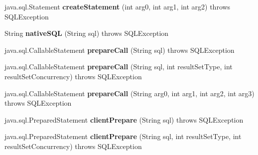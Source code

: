 \begin{DoxyCompactItemize}
java.\+sql.\+Statement {\bfseries create\+Statement} (int arg0, int arg1, int arg2)  throws S\+Q\+L\+Exception 
\item 
\mbox{\label{classcom_1_1mysql_1_1cj_1_1jdbc_1_1_connection_wrapper_aa607c2499080c544ea93a43c2e1e635a}} 
String {\bfseries native\+S\+QL} (String sql)  throws S\+Q\+L\+Exception 
\item 
\mbox{\label{classcom_1_1mysql_1_1cj_1_1jdbc_1_1_connection_wrapper_ab2c7f6bc0a7b9b072867f639c85c5ea7}} 
java.\+sql.\+Callable\+Statement {\bfseries prepare\+Call} (String sql)  throws S\+Q\+L\+Exception 
\item 
\mbox{\label{classcom_1_1mysql_1_1cj_1_1jdbc_1_1_connection_wrapper_ab4275f28104d43202583c58f600d320e}} 
java.\+sql.\+Callable\+Statement {\bfseries prepare\+Call} (String sql, int result\+Set\+Type, int result\+Set\+Concurrency)  throws S\+Q\+L\+Exception 
\item 
\mbox{\label{classcom_1_1mysql_1_1cj_1_1jdbc_1_1_connection_wrapper_af1c5e71dfedb6faeeff1964a37ea833a}} 
java.\+sql.\+Callable\+Statement {\bfseries prepare\+Call} (String arg0, int arg1, int arg2, int arg3)  throws S\+Q\+L\+Exception 
\item 
\mbox{\label{classcom_1_1mysql_1_1cj_1_1jdbc_1_1_connection_wrapper_a9d4c3ed2f9808b0941df0be53b2be648}} 
java.\+sql.\+Prepared\+Statement {\bfseries client\+Prepare} (String sql)  throws S\+Q\+L\+Exception 
\item 
\mbox{\label{classcom_1_1mysql_1_1cj_1_1jdbc_1_1_connection_wrapper_a97c0bd9d37c2cf6bfd6c0cf9e30fb101}} 
java.\+sql.\+Prepared\+Statement {\bfseries client\+Prepare} (String sql, int result\+Set\+Type, int result\+Set\+Concurrency)  throws S\+Q\+L\+Exception 
\item 
\mbox{\label{classcom_1_1mysql_1_1cj_1_1jdbc_1_1_connection_wrapper_a8f2985cd44be623704304c96619992ca}} 

\end{DoxyCompactItemize}
